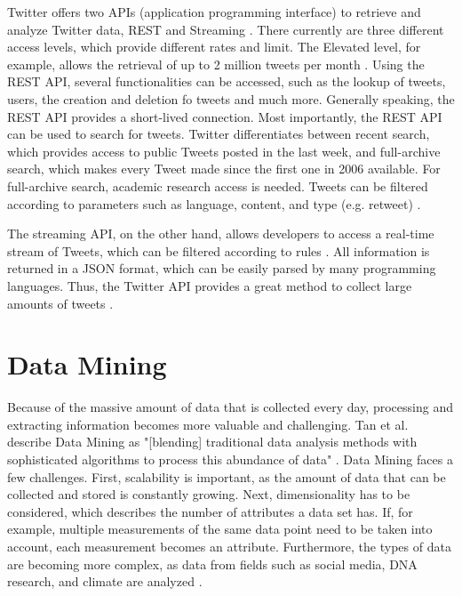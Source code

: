 Twitter offers two APIs (application programming interface) to retrieve and analyze Twitter data, REST and Streaming \cite{DBLP:journals/csur/GiachanouC16}. There currently are three different access levels, which provide different rates and limit. The Elevated level, for example, allows the retrieval of up to 2 million tweets per month \cite{twitter:about}. Using the REST API, several functionalities can be accessed, such as the lookup of tweets, users, the creation and deletion fo tweets and much more. Generally speaking, the REST API provides a short-lived connection. Most importantly, the REST API can be used to search for tweets. Twitter differentiates between recent search, which provides access to public Tweets posted in the last week, and full-archive search, which makes every Tweet made since the first one in 2006 available. For full-archive search, academic research access is needed. Tweets can be filtered according to parameters such as language, content, and type (e.g. retweet) \cite{twitter:search}. 

The streaming API, on the other hand, allows developers to access a real-time stream of Tweets, which can be filtered according to rules \cite{twitter:stream}. All information is returned in a JSON format, which can be easily parsed by many programming languages. Thus, the Twitter API provides a great method to collect large amounts of tweets \cite{DBLP:journals/csur/GiachanouC16}.


\section{Data Mining}
Because of the massive amount of data that is collected every day, processing and extracting information becomes more valuable and challenging. Tan et al. describe Data Mining as "[blending] traditional data analysis methods with sophisticated algorithms to process this abundance of data" \cite[p.~21]{DBLP:books/aw/TanSKK2019}. Data Mining faces a few challenges. First, scalability is important, as the amount of data that can be collected and stored is constantly growing. Next, dimensionality has to be considered, which describes the number of attributes a data set has. If, for example, multiple measurements of the same data point need to be taken into account, each measurement becomes an attribute. Furthermore, the types of data are becoming more complex, as data from fields such as social media, DNA research, and climate are analyzed \cite{DBLP:books/aw/TanSKK2019}.

